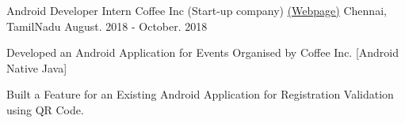 \begin{cventries}
  \cventry
    {Android Developer Intern} %
    {Coffee Inc (Start-up company) \href{https://coffeeinc.in/}{(Webpage)}} %
    {Chennai, TamilNadu} %
    {August. 2018 - October. 2018} %
    {
      \begin{cvitems} %
        \item {Developed an Android Application for Events Organised by Coffee Inc. [Android Native Java]}
        \item {Built a Feature for an Existing Android Application for Registration Validation using QR Code.}
      \end{cvitems}
    }


\end{cventries}
